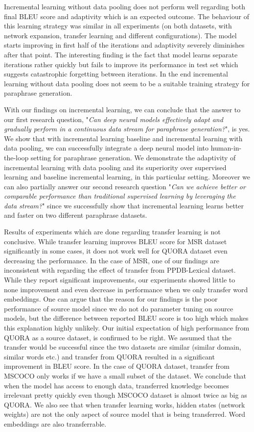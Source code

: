 Incremental learning without data pooling does not perform well regarding both final BLEU score and adaptivity which is an expected outcome. The behaviour of this learning strategy was similar in all experiments (on both datasets, with network expansion, transfer learning and different configurations). The model starts improving in first half of the iterations and adaptivity severely diminishes after that point. The interesting finding is the fact that model learns separate iterations rather quickly but fails to improve its performance in test set which suggests catastrophic forgetting between iterations. In the end incremental learning without data pooling does not seem to be a suitable training strategy for paraphrase generation.

With our findings on incremental learning, we can conclude that the answer to our first research question, "\textit{Can deep neural models effectively adapt and gradually perform in a continuous data stream for paraphrase generation?}", is yes. We show that with incremental learning baseline and incremental learning with data pooling, we can successfully integrate a deep neural model into human-in-the-loop setting for paraphrase generation. We demonstrate the adaptivity of incremental learning with data pooling and its superiority over supervised learning and baseline incremental learning, in this particular setting. Moreover we can also partially answer our second research question "\textit{Can we achieve better or comparable performance than traditional supervised learning by leveraging the data stream?}" since we successfully show that incremental learning learns better and faster on two different paraphrase datasets.


Results of experiments which are done regarding transfer learning is not conclusive. While transfer learning improves BLEU score for MSR dataset significantly in some cases, it does not work well for QUORA dataset even decreasing the performance. In the case of MSR, one of our findings are inconsistent with \cite{brad} regarding the effect of transfer from PPDB-Lexical dataset. While they report significant improvements, our experiments showed little to none improvement and even decrease in performance when we only transfer word embeddings. One can argue that the reason for our findings is the poor performance of source model since we do not do parameter tuning on source models, but the difference between reported BLEU score is too high which makes this explanation highly unlikely. Our initial expectation of high performance from QUORA as a source dataset, is confirmed to be right. We assumed that the transfer would be successful since the two datasets are similar (similar domain, similar words etc.) and transfer from QUORA resulted in a significant improvement in BLEU score. In the case of QUORA dataset, transfer from MSCOCO only works if we have a small subset of the dataset. We conclude that when the model has access to enough data, transferred knowledge becomes irrelevant pretty quickly even though MSCOCO dataset is almost twice as big as QUORA. We also see that when transfer learning works, hidden states (network weights) are not the only aspect of source model that is being transferred. Word embeddings are also transferrable. 

